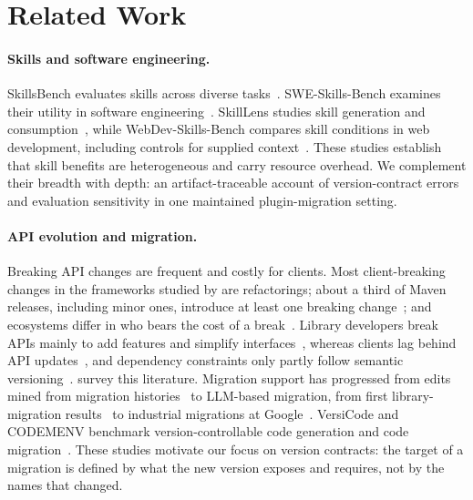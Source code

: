 \documentclass[11pt]{article}
\begin{document}
\section{Related Work}\label{sec:related}
\paragraph{Skills and software engineering.}
SkillsBench evaluates skills across diverse tasks~\citep{skillsbench}. SWE-Skills-Bench examines their utility in software engineering~\citep{swe-skills-bench}. SkillLens studies skill generation and consumption~\citep{skilllens}, while WebDev-Skills-Bench compares skill conditions in web development, including controls for supplied context~\citep{webdev-skills-bench}. These studies establish that skill benefits are heterogeneous and carry resource overhead. We complement their breadth with depth: an artifact-traceable account of version-contract errors and evaluation sensitivity in one maintained plugin-migration setting.

\paragraph{API evolution and migration.}
Breaking API changes are frequent and costly for clients. Most client-breaking changes in the frameworks studied by \citet{dig2006apievolve} are refactorings; about a third of Maven releases, including minor ones, introduce at least one breaking change~\citep{raemaekers2017semver}; and ecosystems differ in who bears the cost of a break~\citep{bogart2016break}. Library developers break APIs mainly to add features and simplify interfaces~\citep{brito2018whyhow}, whereas clients lag behind API updates~\citep{mcdonnell2013android,kula2018update}, and dependency constraints only partly follow semantic versioning~\citep{decan2021semver}. \citet{lamothe2021apievolution} survey this literature. Migration support has progressed from edits mined from migration histories~\citep{xu2019meditor} to LLM-based migration, from first library-migration results~\citep{almeida2024llmmigration} to industrial migrations at Google~\citep{ziftci2025migrating,nikolov2025google}. VersiCode and CODEMENV benchmark version-controllable code generation and code migration~\citep{versicode,codemenv}. These studies motivate our focus on version contracts: the target of a migration is defined by what the new version exposes and requires, not by the names that changed.
\end{document}

